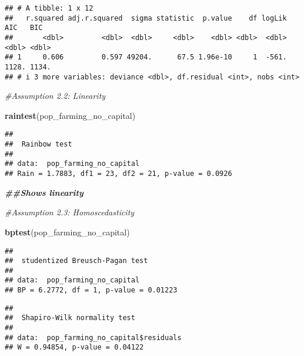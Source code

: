 \documentclass[
]{article}
\newenvironment{Shaded}{\begin{snugshade}}{\end{snugshade}}
\newcommand{\CommentTok}[1]{\textcolor[rgb]{0.56,0.35,0.01}{\textit{#1}}}
\newcommand{\DocumentationTok}[1]{\textcolor[rgb]{0.56,0.35,0.01}{\textbf{\textit{#1}}}}
\newcommand{\FunctionTok}[1]{\textcolor[rgb]{0.13,0.29,0.53}{\textbf{#1}}}
\newcommand{\NormalTok}[1]{#1}
\newcommand{\SpecialCharTok}[1]{\textcolor[rgb]{0.81,0.36,0.00}{\textbf{#1}}}
\begin{document}
\begin{verbatim}
## # A tibble: 1 x 12
##   r.squared adj.r.squared  sigma statistic  p.value    df logLik   AIC   BIC
##       <dbl>         <dbl>  <dbl>     <dbl>    <dbl> <dbl>  <dbl> <dbl> <dbl>
## 1     0.606         0.597 49204.      67.5 1.96e-10     1  -561. 1128. 1134.
## # i 3 more variables: deviance <dbl>, df.residual <int>, nobs <int>
\end{verbatim}

\begin{Shaded}
\begin{Highlighting}[]
\CommentTok{\#Assumption 2.2: Linearity}

\FunctionTok{raintest}\NormalTok{(pop\_farming\_no\_capital)}
\end{Highlighting}
\end{Shaded}

\begin{verbatim}
## 
##  Rainbow test
## 
## data:  pop_farming_no_capital
## Rain = 1.7883, df1 = 23, df2 = 21, p-value = 0.0926
\end{verbatim}

\begin{Shaded}
\begin{Highlighting}[]
\DocumentationTok{\#\#Shows linearity}

\CommentTok{\#Assumption 2.3: Homoscedasticity}

\FunctionTok{bptest}\NormalTok{(pop\_farming\_no\_capital)}
\end{Highlighting}
\end{Shaded}

\begin{verbatim}
## 
##  studentized Breusch-Pagan test
## 
## data:  pop_farming_no_capital
## BP = 6.2772, df = 1, p-value = 0.01223
\end{verbatim}

\begin{Shaded}
\end{Shaded}

\begin{verbatim}
## 
##  Shapiro-Wilk normality test
## 
## data:  pop_farming_no_capital$residuals
## W = 0.94854, p-value = 0.04122
\end{verbatim}
\end{document}
